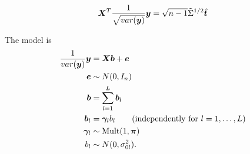 \begin{equation}
    \bm X^{T} \frac{1}{\sqrt{var(\bm y)}}\bm y = \sqrt{n-1} \tilde{\Sigma}^{1/2} \hat{\bm{t}}
\end{equation}

The \susie model is
\begin{align}
\frac{1}{var(\bm y)}\bm y &= \bm X\bm b + \bm e \\
\bm e & \sim N(0, I_n) \\ 
\bm b &= \sum_{l=1}^L \bm b_l\\
\bm b_l & = \bm \gamma_l b_l \qquad (\text{independently for } l=1,\dots,L)\\
\bm \gamma_l & \sim \text{Mult}(1,\bm \pi) \\
b_l & \sim N(0,\sigma^2_{0l}).
\end{align}